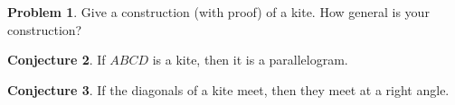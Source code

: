 \documentclass{tufte-handout}
\theoremstyle{definition}
\newtheorem{problem}{Problem}[section]
\newtheorem{conjecture}[problem]{Conjecture}
\begin{document}
\begin{problem}\label{prob:construct-kites}
Give a construction (with proof) of a kite.
How general is your construction?
\end{problem}

\begin{conjecture}\label{conj:kite-is-parallelogram}
If $ABCD$ is a kite, then it is a parallelogram.
\end{conjecture}

\begin{conjecture}\label{conj:kite-diagonals-perpendicular}
If the diagonals of a kite meet, then they meet at a right angle.
\end{conjecture}

\vfill
\end{document}
